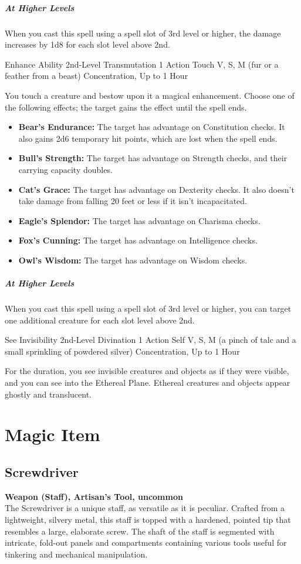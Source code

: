 {\subparagraph*{At Higher Levels} When you cast this spell using a spell slot of 3rd level or higher, the damage increases by 1d8 for each slot level above 2nd.

\DndSpellHeader
  {Enhance Ability}
  {2nd-Level Transmutation}
  {1 Action}
  {Touch}
  {V, S, M (fur or a feather from a beast)}
  {Concentration, Up to 1 Hour}
  
You touch a creature and bestow upon it a magical enhancement. Choose one of the following effects; the target gains the effect until the spell ends.
\begin{itemize}
	\item \textbf{Bear's Endurance:} The target has advantage on Constitution checks. It also gains 2d6 temporary hit points, which are lost when the spell ends.
	\item \textbf{Bull's Strength:} The target has advantage on Strength checks, and their carrying capacity doubles.
	\item \textbf{Cat's Grace:} The target has advantage on Dexterity checks. It also doesn’t take damage from falling 20 feet or less if it isn't incapacitated.
	\item \textbf{Eagle's Splendor:} The target has advantage on Charisma checks.
	\item \textbf{Fox's Cunning:} The target has advantage on Intelligence checks.
	\item \textbf{Owl's Wisdom:} The target has advantage on Wisdom checks.
\end{itemize}

\subparagraph*{At Higher Levels} When you cast this spell using a spell slot of 3rd level or higher, you can target one additional creature for each slot level above 2nd.

\DndSpellHeader
  {See Invisibility}
  {2nd-Level Divination}
  {1 Action}
  {Self}
  {V, S, M (a pinch of talc and a small sprinkling of powdered silver)}
  {Concentration, Up to 1 Hour}
  
For the duration, you see invisible creatures and objects as if they were visible, and you can see into the Ethereal Plane. Ethereal creatures and objects appear ghostly and translucent.

\section*{Magic Item}
\subsection*{Screwdriver}
\textbf{Weapon (Staff), Artisan's Tool, uncommon}\\
The Screwdriver is a unique staff, as versatile as it is peculiar. Crafted from a lightweight, silvery metal, this staff is topped with a hardened, pointed tip that resembles a large, elaborate screw. The shaft of the staff is segmented with intricate, fold-out panels and compartments containing various tools useful for tinkering and mechanical manipulation.

}
